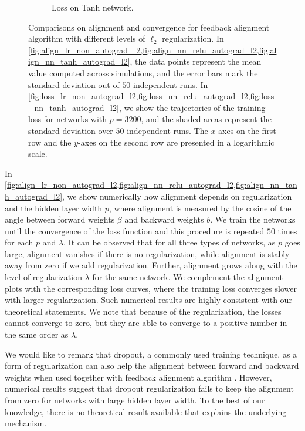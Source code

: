 \begin{figure}[ht]
\begin{subfigure}[b]{.33\textwidth}
  \caption{Loss on Tanh network.}
  \label{fig:loss_nn_tanh_autograd_l2}
\end{subfigure}
\caption{Comparisons on alignment and convergence for feedback alignment algorithm with different levels of $\ell_2$ regularization. In \cref{fig:align_lr_non_autograd_l2,fig:align_nn_relu_autograd_l2,fig:align_nn_tanh_autograd_l2}, the data points represent the mean value computed across simulations, and the error bars mark the standard deviation out of $50$ independent runs. In \cref{fig:loss_lr_non_autograd_l2,fig:loss_nn_relu_autograd_l2,fig:loss_nn_tanh_autograd_l2}, we show the trajectories of the training loss for networks with $p = 3200$, and the shaded areas represent the standard deviation over $50$ independent runs. The $x$-axes on the first row and the $y$-axes on the second row are presented in a logarithmic scale.}
\label{fig:synthetic-l2}
\end{figure}

In \cref{fig:align_lr_non_autograd_l2,fig:align_nn_relu_autograd_l2,fig:align_nn_tanh_autograd_l2}, we show numerically how alignment depends on regularization and the hidden layer width $p$, where alignment is measured by the cosine of the angle between forward weights $\beta$ and backward weights $b$. We train the networks until the convergence of the loss function and this procedure is repeated $50$ times for each $p$ and $\lambda$. It can be observed that for all three types of networks, as $p$ goes large, alignment vanishes if there is no regularization, while alignment is stably away from zero if we add regularization. Further, alignment grows along with the level of regularization $\lambda$ for the same network. We complement the alignment plots with the corresponding loss curves, where the training loss converges slower with larger regularization. Such numerical results are highly consistent with our theoretical statements. We note that because of the regularization, the losses cannot converge to zero, but they are able to converge to a positive number in the same order as $\lambda$.

We would like to remark that dropout, a commonly used training technique, as a form of regularization can also help the alignment between forward and backward weights when used together with feedback alignment algorithm \citep{wager2013dropout}. However, numerical results suggest that dropout regularization fails to keep the alignment from zero for networks with large hidden layer width. To the best of our knowledge, there is no theoretical result available that explains the underlying mechanism.


